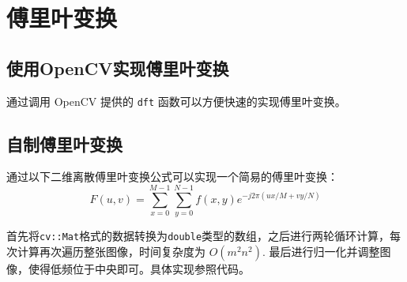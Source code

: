 \documentclass{article}
\begin{document}
\section{傅里叶变换}
\label{fft}

\subsection{使用OpenCV实现傅里叶变换}

通过调用 OpenCV 提供的 \texttt{dft} 函数可以方便快速的实现傅里叶变换。

\subsection{自制傅里叶变换}

通过以下二维离散傅里叶变换公式可以实现一个简易的傅里叶变换：
$$F(u, v)=\sum_{x=0}^{M-1}\sum_{y=0}^{N-1}f(x, y)e^{-j2\pi (ux/M+vy/N)}$$

首先将\texttt{cv::Mat}格式的数据转换为\texttt{double}类型的数组，之后进行两轮循环计算，每次计算再次遍历整张图像，时间复杂度为 $O(m^2n^2)$.
最后进行归一化并调整图像，使得低频位于中央即可。具体实现参照代码。
\end{document}
